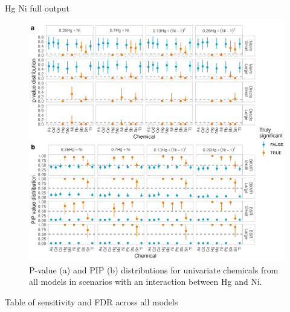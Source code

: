 \documentclass[12pt, twoside]{amherstthesis}
\begin{document}
Hg Ni full output
\begin{figure}

{\centering \includegraphics[width=1\linewidth]{figures/ch4_hgni_univ} 

}

\caption{P-value (a) and PIP (b) distributions for univariate chemicals from all models in scenarios with an interaction between Hg and Ni.}\label{fig:hgniuniv}
\end{figure}
Table of sensitivity and FDR across all models
\end{document}
